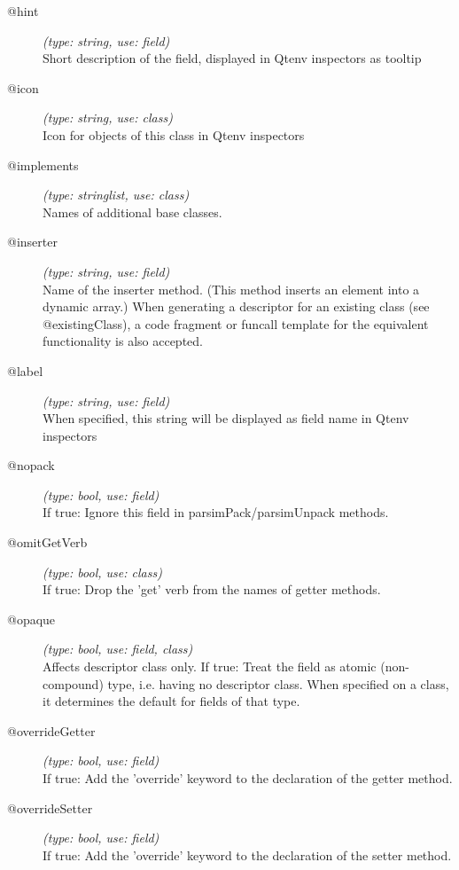 \begin{description}
\item[@hint] \textit{(type: string, use: field)} \\
  Short description of the field, displayed in Qtenv inspectors as tooltip

\item[@icon] \textit{(type: string, use: class)} \\
  Icon for objects of this class in Qtenv inspectors

\item[@implements] \textit{(type: stringlist, use: class)} \\
  Names of additional base classes.

\item[@inserter] \textit{(type: string, use: field)} \\
  Name of the inserter method. (This method inserts an element into a dynamic
  array.) When generating a descriptor for an existing class (see
  @existingClass), a code fragment or funcall template for the equivalent
  functionality is also accepted.

\item[@label] \textit{(type: string, use: field)} \\
  When specified, this string will be displayed as field name in Qtenv
  inspectors

\item[@nopack] \textit{(type: bool, use: field)} \\
  If true: Ignore this field in parsimPack/parsimUnpack methods.

\item[@omitGetVerb] \textit{(type: bool, use: class)} \\
  If true: Drop the 'get' verb from the names of getter methods.

\item[@opaque] \textit{(type: bool, use: field, class)} \\
  Affects descriptor class only. If true: Treat the field as atomic
  (non-compound) type, i.e. having no descriptor class. When specified on a
  class, it determines the default for fields of that type.

\item[@overrideGetter] \textit{(type: bool, use: field)} \\
  If true: Add the 'override' keyword to the declaration of the getter method.

\item[@overrideSetter] \textit{(type: bool, use: field)} \\
  If true: Add the 'override' keyword to the declaration of the setter method.


\end{description}
